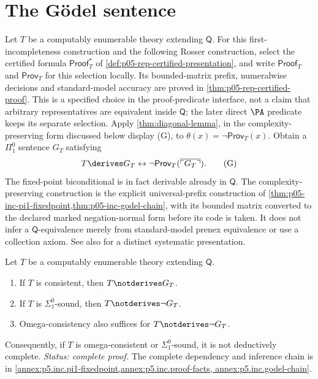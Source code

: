 \section{The G\"odel sentence}
\label{sec:first-incompleteness-03}

Let \(T\) be a computably enumerable theory extending \(\mathsf Q\).
For this first-incompleteness construction and the following Rosser
construction, select the certified formula
\(\mathsf{Proof}^{*}_T\) of
\cref{def:p05-rep-certified-presentation}, and write
\(\mathsf{Proof}_T\) and \(\mathsf{Prov}_T\) for this selection locally.
Its bounded-matrix prefix, numeralwise decisions and standard-model
accuracy are proved in \cref{thm:p05-rep-certified-proof}.
This is a specified choice in the proof-predicate interface, not a claim
that arbitrary representatives are equivalent inside \(\mathsf Q\);
the later direct \(\PA\) predicate keeps its separate selection.
Apply
\cref{thm:diagonal-lemma}, in the complexity-preserving form discussed
below display (G), to
\(\theta(x)=\neg\mathsf{Prov}_T(x)\).  Obtain a \(\Pi^0_1\) sentence \(G_T\)
satisfying
\[
  T\derives G_T\leftrightarrow
  \neg\mathsf{Prov}_T(\overline{\ulcorner G_T\urcorner}).
  \tag{G}
\]
The fixed-point biconditional is in fact derivable already in \(\mathsf Q\).
The complexity-preserving construction is the explicit universal-prefix
construction of \cref{thm:p05-inc-pi1-fixedpoint,thm:p05-inc-godel-chain},
with its bounded matrix converted to the declared marked
negation-normal form before its code is taken.  It does not infer a
\(\mathsf Q\)-equivalence merely from standard-model prenex equivalence
or use a collection axiom.  See also \cite{Shoenfield1967} for a distinct
systematic presentation.

\begin{theorem}
\label{thm:godel-first}
Let \(T\) be a computably enumerable theory extending \(\mathsf Q\).
\begin{enumerate}
  \item If \(T\) is consistent, then \(T\notderives G_T\).
  \item If \(T\) is \(\Sigma^0_1\)-sound, then
        \(T\notderives\neg G_T\).
  \item Omega-consistency also suffices for
        \(T\notderives\neg G_T\).
\end{enumerate}
Consequently, if \(T\) is omega-consistent or \(\Sigma^0_1\)-sound, it is not
deductively complete.
\textit{Status: complete proof.}  The complete dependency and inference
chain is in \cref{annex:p5.inc.pi1-fixedpoint,annex:p5.inc.proof-facts,
annex:p5.inc.godel-chain}.
\end{theorem}

